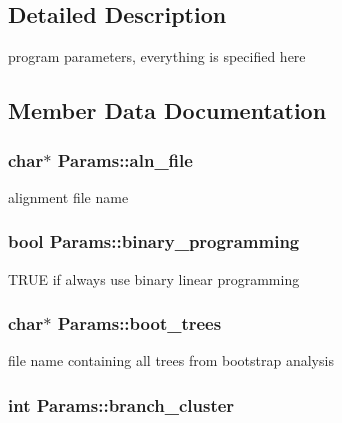 \subsection{Detailed Description}
program parameters, everything is specified here 

\subsection{Member Data Documentation}
\hypertarget{structParams_a9d9693f707bda46bd7b29e1c2dcd2d27}{
\subsubsection[{aln\_\-file}]{\setlength{\rightskip}{0pt plus 5cm}char$\ast$ {\bf Params::aln\_\-file}}}
\label{structParams_a9d9693f707bda46bd7b29e1c2dcd2d27}
alignment file name \hypertarget{structParams_a9386717dfd35f6fa4ecde965aadef2cb}{
\subsubsection[{binary\_\-programming}]{\setlength{\rightskip}{0pt plus 5cm}bool {\bf Params::binary\_\-programming}}}
\label{structParams_a9386717dfd35f6fa4ecde965aadef2cb}
TRUE if always use binary linear programming \hypertarget{structParams_aa62c599d6c296704df86389b6be31cba}{
\subsubsection[{boot\_\-trees}]{\setlength{\rightskip}{0pt plus 5cm}char$\ast$ {\bf Params::boot\_\-trees}}}
\label{structParams_aa62c599d6c296704df86389b6be31cba}
file name containing all trees from bootstrap analysis \hypertarget{structParams_a5ca0c7f44245eca4522cfcf82fb5490a}{
\subsubsection[{branch\_\-cluster}]{\setlength{\rightskip}{0pt plus 5cm}int {\bf Params::branch\_\-cluster}}}
\label{structParams_a5ca0c7f44245eca4522cfcf82fb5490a}
